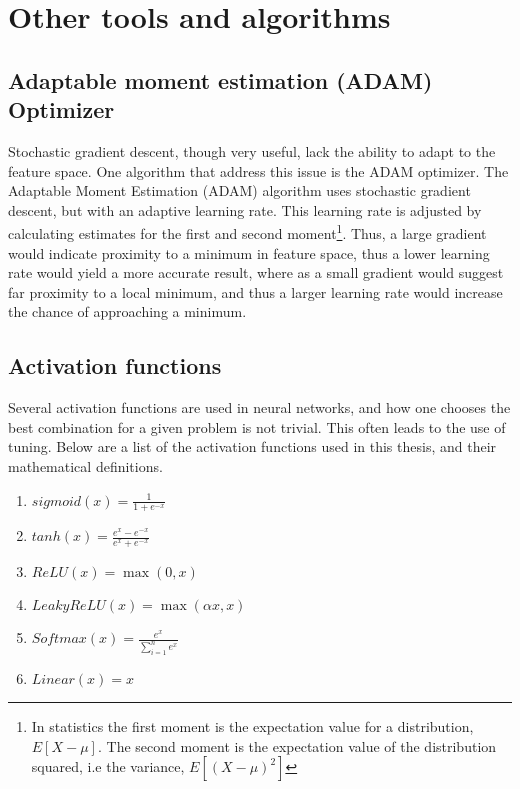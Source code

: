 \section{Other tools and algorithms}
\subsection*{Adaptable moment estimation (ADAM) Optimizer}\label{sec:adam}
Stochastic gradient descent, though very useful, lack the ability to adapt to the feature space. One algorithm that address this
issue is the ADAM optimizer\cite{ADAM:opti}. The Adaptable Moment Estimation (ADAM) algorithm uses stochastic gradient descent, but with 
an adaptive learning rate. This learning rate is adjusted by calculating estimates for the first and second moment\footnote{In statistics
the first moment is the expectation value for a distribution, $E[X-\mu]$. The second moment is the 
expectation value of the distribution squared, i.e the variance, $E[(X-\mu)^2]$}. Thus, a large gradient would indicate proximity 
to a minimum in feature space, thus a lower learning rate would yield a more accurate result, 
where as a small gradient would suggest far proximity to a local minimum, and thus a larger learning rate would increase the chance 
of approaching a minimum.\par 


\subsection*{Activation functions}
Several activation functions are used in neural networks, and how one chooses the best combination for a given problem is not trivial. 
This often leads to the use of tuning. Below are a list of the activation functions used in this thesis, and their mathematical definitions. 

\begin{enumerate}
    \item  $sigmoid(x) = \frac{1}{1+e^{-x}}$
    \item $tanh(x) = \frac{e^x-e^{-x}}{e^x+e^{-x}}$
    \item $ReLU(x) = \max(0,x)$
    \item $LeakyReLU(x) = \max(\alpha x,x)$
    \item $Softmax(x) = \frac{e^x}{\sum_{i=1}^n e^x}$
    \item $Linear(x) = x$
\end{enumerate}


